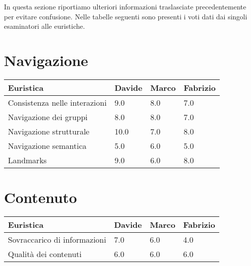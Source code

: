 In questa sezione riportiamo ulteriori informazioni traslasciate precedentemente
per evitare confusione. Nelle tabelle seguenti sono presenti i voti dati dai
singoli esaminatori alle euristiche.

    \section{Navigazione}
    \begin{table}[H]
        \begin{tabular}{|l|l|l|l|}
            \hline \textbf{Euristica} & \textbf{Davide} & \textbf{Marco} &
            \textbf{Fabrizio}\\ \hline
            Consistenza nelle interazioni           & 9.0   & 8.0   & 7.0   \\ \hline
            Navigazione dei gruppi                  & 8.0   & 8.0   & 7.0   \\ \hline
            Navigazione strutturale                 & 10.0  & 7.0   & 8.0   \\ \hline
            Navigazione semantica                   & 5.0   & 6.0   & 5.0   \\ \hline
            Landmarks                               & 9.0   & 6.0   & 8.0   \\ \hline
            \end{tabular}
        \end{table}

    \section{Contenuto}
    \begin{table}[H]
        \begin{tabular}{|l|l|l|l|}
        \hline \textbf{Euristica} & \textbf{Davide} & \textbf{Marco} &
        \textbf{Fabrizio} \\ \hline
        Sovraccarico di informazioni    & 7.0   & 6.0   & 4.0   \\ \hline
        Qualità dei contenuti           & 6.0   & 6.0   & 6.0   \\ \hline
        \end{tabular}
        \end{table}


